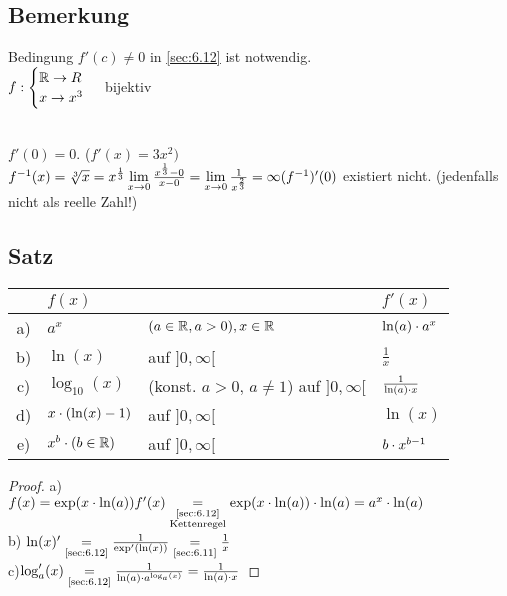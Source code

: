 \subsection{Bemerkung}
Bedingung $f'(c) \ne 0$ in \ref{sec:6.12} ist notwendig.\\
$f : \begin{cases}
\mathbb{R} \to R\\
x \to x^3
\end{cases}$ bijektiv \qquad
{}\\
$f'(0) = 0.$ \hfill ($f'(x) =3x^2)$\\
$f^{-1}(x) = \sqrt[3]{x} = x^{\frac{1}{3}}\\
\lim\limits_{x \to 0} \frac{x^{\frac{1}{3}} - 0}{x - 0} = \lim\limits_{x \to 0} \frac{1}{x^{\frac{2}{3}}} = \infty\\
(f^{-1})'(0)$ existiert nicht. (jedenfalls nicht als reelle Zahl!)
\subsection[Satz]{Satz}\label{sec:6.14}
\begin{tabular}{cll|l}
& $f(x)$ & & $f'(x)$\\
\hline
a) & $a^x$ & $(a \in \mathbb{R}, a> 0), x\in \mathbb{R}$ & $\ln(a) \cdot a^x$\\
b) & $\ln(x)$ & auf $]0,\infty[$ & $\frac{1}{x}$\\
c) & $\log_{10}(x)$ & (konst. $a > 0,\, a \ne 1$) auf $]0,\infty[$ & $\frac{1}{\ln(a) \cdot x}$\\
d) & $x \cdot (\ln(x) -1 )$ & auf $]0,\infty[$ & $\ln(x)$\\
e) & $x^b \cdot (b \in \mathbb{R})$& auf $]0,\infty[ $ & $b \cdot x^{b-1}$ 
\end{tabular}
\begin{proof}
a)\\
$f(x) = \exp(x \cdot \ln(a))\\
f'(x) \underset{\substack
	{\text{\ref{sec:6.12}}\\\text{Kettenregel}}}{=} \exp(x \cdot \ln(a)) \cdot \ln(a) = a^x \cdot \ln(a)$\\
b) $\ln(x)'  \underset{\text{\ref{sec:6.12}}}{=} \frac{1}{\exp'(\ln(x))} \underset{\text{\ref{sec:6.11}}}{=} \frac{1}{x}$\\
c)$ \log'_a(x) \underset{\text{\ref{sec:6.12}}}{=} \frac{1}{\ln(a) \cdot a^{\log_a(x)}} = \frac{1}{\ln(a) \cdot x}$
\end{proof}
